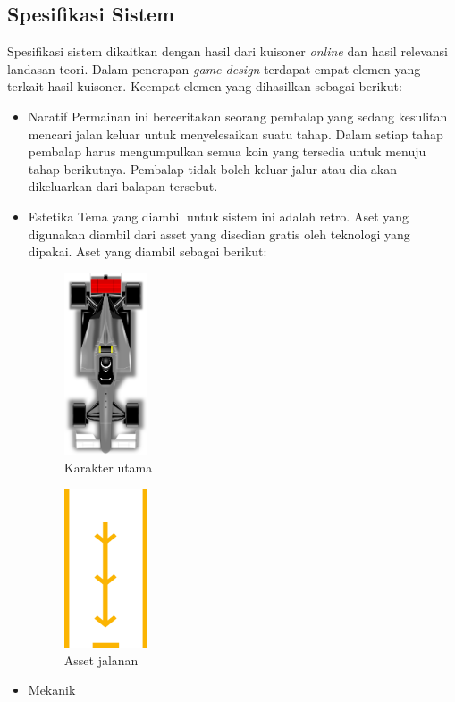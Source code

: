 	\subsection{Spesifikasi Sistem}
		Spesifikasi sistem dikaitkan dengan hasil dari kuisoner \textit{online} dan hasil relevansi landasan teori. Dalam penerapan \textit{game design} terdapat empat elemen yang terkait hasil kuisoner. Keempat elemen yang dihasilkan sebagai berikut:
		\begin{itemize}
			\item Naratif
				\subitem Permainan ini berceritakan seorang pembalap yang sedang kesulitan mencari jalan keluar untuk menyelesaikan suatu tahap. Dalam setiap tahap pembalap harus mengumpulkan semua koin yang tersedia untuk menuju tahap berikutnya. Pembalap tidak boleh keluar jalur atau dia akan dikeluarkan dari balapan tersebut.
			\item Estetika
				\subitem Tema yang diambil untuk sistem ini adalah retro. Aset yang digunakan diambil dari asset yang disedian gratis oleh teknologi yang dipakai. Aset yang diambil sebagai berikut:
				\begin{figure}
					\centering
					\includegraphics[width=70pt]{pics/aset/1}
					\caption{Karakter utama}
				\end{figure}
				\begin{figure}
					\centering
					\includegraphics[width=70pt]{pics/aset/2}
					\caption{Asset jalanan}
				\end{figure}
			\item Mekanik

\end{itemize}
